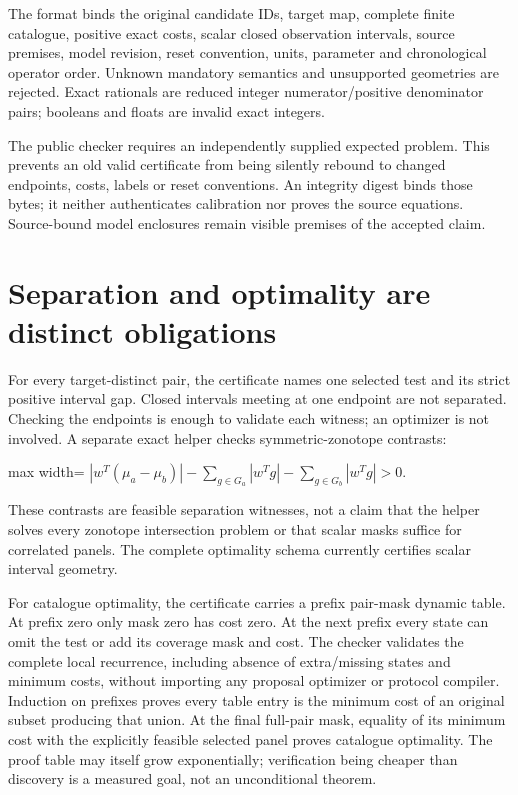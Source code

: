 \documentclass[
  11pt,
  a4paper,
]{report}
\let\singularitytexttt\texttt
\renewcommand{\texttt}[1]{\singularitytexttt{\seqsplit{#1}}}
\begin{document}
The \texttt{nx.experiment\_decision/1} format binds the original
candidate IDs, target map, complete finite catalogue, positive exact
costs, scalar closed observation intervals, source premises, model
revision, reset convention, units, parameter and chronological operator
order. Unknown mandatory semantics and unsupported geometries are
rejected. Exact rationals are reduced integer numerator/positive
denominator pairs; booleans and floats are invalid exact integers.

The public checker requires an independently supplied expected problem.
This prevents an old valid certificate from being silently rebound to
changed endpoints, costs, labels or reset conventions. An integrity
digest binds those bytes; it neither authenticates calibration nor
proves the source equations. Source-bound model enclosures remain
visible premises of the accepted claim.

\hypertarget{separation-and-optimality-are-distinct-obligations}{%
\section{Separation and optimality are distinct
obligations}\label{separation-and-optimality-are-distinct-obligations}}

For every target-distinct pair, the certificate names one selected test
and its strict positive interval gap. Closed intervals meeting at one
endpoint are not separated. Checking the endpoints is enough to validate
each witness; an optimizer is not involved. A separate exact helper
checks symmetric-zonotope contrasts:

\begin{center}
\begin{adjustbox}{max width=\linewidth}
$\displaystyle
|w^T(\mu_a-\mu_b)|-
\sum_{g\in G_a}|w^Tg|-
\sum_{g\in G_b}|w^Tg|>0.
$
\end{adjustbox}
\end{center}

These contrasts are feasible separation witnesses, not a claim that the
helper solves every zonotope intersection problem or that scalar masks
suffice for correlated panels. The complete optimality schema currently
certifies scalar interval geometry.

For catalogue optimality, the certificate carries a prefix pair-mask
dynamic table. At prefix zero only mask zero has cost zero. At the next
prefix every state can omit the test or add its coverage mask and cost.
The checker validates the complete local recurrence, including absence
of extra/missing states and minimum costs, without importing any
proposal optimizer or protocol compiler. Induction on prefixes proves
every table entry is the minimum cost of an original subset producing
that union. At the final full-pair mask, equality of its minimum cost
with the explicitly feasible selected panel proves catalogue optimality.
The proof table may itself grow exponentially; verification being
cheaper than discovery is a measured goal, not an unconditional theorem.
\end{document}
